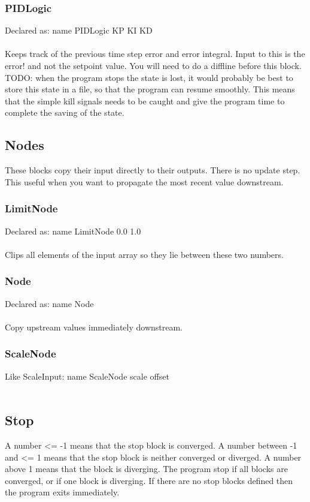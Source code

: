 \documentclass[a4paper]{article}
\begin{document}
\subsubsection{PIDLogic}
Declared as: name PIDLogic KP KI KD\\\\
Keeps track of the previous time step error and error integral. Input to this is the error! and not the setpoint value. You will need to do a diffline before this block. TODO: when the program stops the state is lost, it would probably be best to store this state in a file, so that the program can resume smoothly. This means that the simple kill signals needs to be caught and give the program time to complete the saving of the state.\\
\subsection{Nodes}
These blocks copy their input directly to their outputs. There is no update step. This useful when you want to propagate the most recent value downstream.
\subsubsection{LimitNode}
Declared as: name LimitNode 0.0 1.0\\\\
Clips all elements of the input array so they lie between these two numbers.
\subsubsection{Node}
Declared as: name Node\\\\
Copy upstream values immediately downstream.
\subsubsection{ScaleNode}
Like ScaleInput: name ScaleNode scale offset\\\\
\subsection{Stop}
A number <= -1 means that the stop block is converged. A number between -1 and <= 1 means that the stop block is neither converged or diverged. A number above 1 means that the block is diverging. The program stop if all blocks are converged, or if one block is diverging. If there are no stop blocks defined then the program exits immediately.
\end{document}
